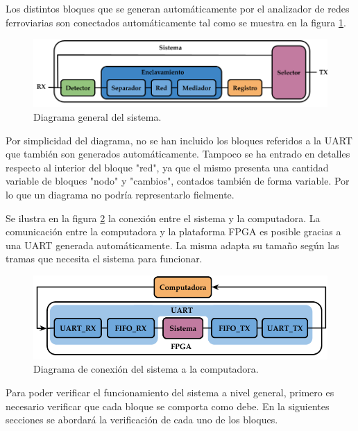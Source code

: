 	Los distintos bloques que se generan automáticamente por el analizador de redes ferroviarias son conectados automáticamente tal como se muestra en la figura \ref{fig:Diagrama_general}. 
	
	\begin{figure}[h]
	\centering
	\includegraphics[scale=0.45]{./Figures/Diagrama_general}
		\caption{Diagrama general del sistema.}
		\label{fig:Diagrama_general}
	\end{figure}
	
	\vspace{2cm}
	
	Por simplicidad del diagrama, no se han incluido los bloques referidos a la UART que también son generados automáticamente. Tampoco se ha entrado en detalles respecto al interior del bloque "red", ya que el mismo presenta una cantidad variable de bloques "nodo" y "cambios", contados también de forma variable. Por lo que un diagrama no podría representarlo fielmente.
	
	Se ilustra en la figura \ref{fig:UART_General} la conexión entre el sistema y la computadora. La comunicación entre la computadora y la plataforma FPGA es posible gracias a una UART generada automáticamente. La misma adapta su tamaño según las tramas que necesita el sistema para funcionar.
	
	\begin{figure}[h]
	\centering
	\includegraphics[scale=0.5]{./Figures/Diagrama_UART_PC}
		\caption{Diagrama de conexión del sistema a la computadora.}
		\label{fig:UART_General}
	\end{figure}
	
	Para poder verificar el funcionamiento del sistema a nivel general, primero es necesario verificar que cada bloque se comporta como debe. En la siguientes secciones se abordará la verificación de cada uno de los bloques.	
				
